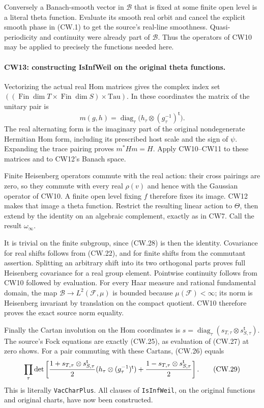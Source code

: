Conversely a Banach-smooth vector in $\mathcal B$ that is fixed at
some finite open level is a literal theta function.  Evaluate its
smooth real orbit and cancel the explicit smooth phase in (CW.1)
to get the source's real-line smoothness.  Quasi-periodicity and
continuity were already part of $\mathcal B$.  Thus the operators
of CW10 may be applied to precisely the functions needed here.

\paragraph{CW13: constructing IsInfWeil on the original theta functions.}
Vectorizing the actual real Hom matrices gives the complex index
set $((\operatorname{Fin}\dim T\times\operatorname{Fin}\dim S)
\times\mathrm{Tau})$.  In these coordinates the matrix of the
unitary pair is
\[
 m(g,h)=\operatorname{diag}_\tau
   \bigl(h_\tau\otimes(g_\tau^{-1})^{\mathsf t}\bigr).
                                                               \tag{CW.28}
\]
The real alternating form is the imaginary part of the original
nondegenerate Hermitian Hom form, including its prescribed host
scale and the sign of $\psi$.  Expanding the trace pairing proves
$m^*Hm=H$.  Apply CW10--CW11 to these matrices and to CW12's
Banach space.

Finite Heisenberg operators commute with the real action: their
cross pairings are zero, so they commute with every real $\rho(v)$
and hence with the Gaussian operator of CW10.  A finite open level
fixing $f$ therefore fixes its image.  CW12 makes that image a theta
function.  Restrict the resulting linear action to $\Theta$, then
extend by the identity on an algebraic complement, exactly as in
CW7.  Call the result $\omega_\infty$.

It is trivial on the finite subgroup, since (CW.28) is then the
identity.  Covariance for real shifts follows from (CW.22), and
for finite shifts from the commutant assertion.  Splitting an
arbitrary shift into its two orthogonal parts proves full
Heisenberg covariance for a real group element.  Pointwise
continuity follows from CW10 followed by evaluation.  For every
Haar measure and rational fundamental domain, the map
$\mathcal B\to L^2(\mathcal F,\mu)$ is bounded because
$\mu(\mathcal F)<\infty$; its norm is Heisenberg invariant by
translation on the compact quotient.  CW10 therefore proves
the exact source norm equality.

Finally the Cartan involution on the Hom coordinates is
$s=\operatorname{diag}_\tau(s_{T,\tau}\otimes
s_{S,\tau}^{\mathsf t})$.  The source's Fock equations are
exactly (CW.25), as evaluation of (CW.27) at zero shows.
For a pair commuting with these Cartans, (CW.26) equals
\[
 \prod_\tau\det\left[
 {1+s_{T,\tau}\otimes s_{S,\tau}^{\mathsf t}\over2}
       (h_\tau\otimes(g_\tau^{-1})^{\mathsf t})
 +{1-s_{T,\tau}\otimes s_{S,\tau}^{\mathsf t}\over2}\right].
                                                               \tag{CW.29}
\]
This is literally \texttt{VacCharPlus}.  All clauses of
\texttt{IsInfWeil}, on the original functions and original charts,
have now been constructed.

